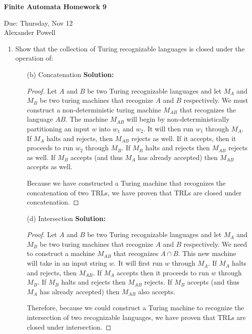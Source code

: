\documentclass[11pt]{article}
\begin{document}
\begin{center}             %
\begin{LARGE}
{\bf Finite Automata Homework 9}
\end{LARGE}
\vskip 0.25cm      %

Due: Thursday, Nov 12\\  %
Alexander Powell
\end{center}

\begin{enumerate}

\item Show that the collection of Turing recognizable languages is closed under the operation of:
\begin{enumerate}
\item[(b)] Concatenation
\textbf{Solution: }
\begin{proof}
Let $A$ and $B$ be two Turing recognizable languages and let $M_A$ and $M_B$ be two turing machines that recognize $A$ and $B$ respectively.  We must construct a non-deterministic turing machine $M_{AB}$ that recognizes the language $AB$.  The machine $M_{AB}$ will begin by non-deterministically partitioning an input $w$ into $w_1$ and $w_2$.  It will then run $w_1$ through $M_A$.  If $M_A$ halts and rejects, then $M_{AB}$ rejects as well.  If it accepts, then it proceeds to run $w_2$ through $M_B$.  If $M_B$ halts and rejects then $M_{AB}$ rejects as well.  If $M_B$ accepts (and thus $M_A$ has already accepted) then $M_{AB}$ accepts as well.  

Because we have constructed a Turing machine that recognizes the concatenation of two TRLs, we have proven that TRLs are closed under concatenation.  
\end{proof}
\item[(d)] Intersection
\textbf{Solution: }
\begin{proof}
Let $A$ and $B$ be two Turing recognizable languages and let $M_A$ and $M_B$ be two turing machines that recognize $A$ and $B$ respectively.  We need to construct a machine $M_{AB}$ that recognizes $A \cap B$.  This new machine will take in an input string $w$.  It will first run $w$ through $M_A$.  If $M_A$ halts and rejects, then $M_{AB}$.  If $M_A$ accepts then it proceeds to run $w$ through $M_B$.  If $M_B$ halts and rejects then $M_{AB}$ rejects.  If $M_B$ accepts (and thus $M_A$ has already accepted) then $M_{AB}$ also accepts.  

Therefore, because we could construct a Turing machine to recognize the intersection of two recognizable languages, we have proven that TRLs are closed under intersection.  
\end{proof}
\end{enumerate}





\end{enumerate}
\end{document}
